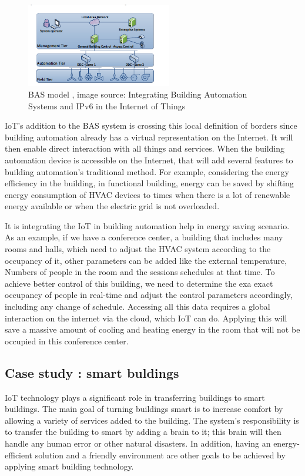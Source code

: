 \documentclass[conference]{IEEEtran}
\begin{document}
\begin{figure}[h!]
	\centering
	\includegraphics[width=2.5in]{newIOt.png}
	\caption{\label{new}  BAS  model
		, image source: Integrating Building Automation Systems and IPv6
in the Internet of Things
		\cite{NewIOT} }
\end{figure}



IoT's addition to the BAS system is crossing this local definition of borders since building automation already has a virtual representation on the Internet. It will then enable direct interaction with all things and services. When the building automation device is accessible on the Internet, that will add several features to building automation's traditional method. For example, considering the energy efficiency in the building, in functional building\cite{NewIOT}, energy can be saved by shifting energy consumption of HVAC devices to times when there is a lot of renewable energy available or when the electric grid is not overloaded. 


It is integrating the IoT in building automation help in energy saving scenario. As an example\cite{NewIOT}, if we have a conference center, a building that includes many rooms and halls, which need to adjust the HVAC system according to the occupancy of it, other parameters can be added like the external temperature, Numbers of people in the room and the sessions schedules at that time. To achieve better control of this building, we need to determine the exa exact occupancy of people in real-time and adjust the control parameters accordingly, including any change of schedule. Accessing all this data requires a global interaction on the internet via the cloud, which IoT can do. Applying this will save a massive amount of cooling and heating energy in the room that will not be occupied in this conference center. 




\subsection{Case study : smart buldings}
IoT technology plays a significant role in transferring buildings to smart buildings. The main goal of turning buildings smart is to increase comfort by allowing a variety of services added to the building. The system's responsibility is to transfer the building to smart by adding a brain to it; this brain will then handle any human error or other natural disasters. In addition, having an energy-efficient solution and a friendly environment are other goals to be achieved by applying smart building technology. 
\end{document}
